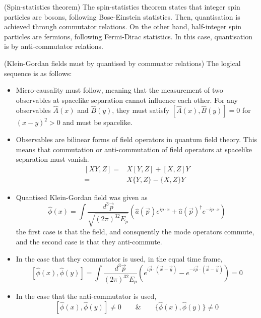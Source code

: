\vspace{2ex}
\begin{thm}
(Spin-statistics theorem) The spin-statistics theorem states that integer spin particles are bosons, following Bose-Einstein statistics. Then, quantisation is achieved through commutator relations. On the other hand, half-integer spin particles are fermions, following Fermi-Dirac statistics. In this case, quantisation is by anti-commutator relations.
\end{thm}
\vspace{2ex}
\begin{ex}
(Klein-Gordan fields must by quantised by commuator relations) The logical sequence is as follows:
\begin{itemize}
\item[(i)] Micro-causality must follow, meaning that the measurement of two observables at spacelike separation cannot influence each other. For any observables $\hat{A}(x)$ and $\hat{B}(y)$, they must satisfy $[\hat{A}(x),\hat{B}(y)]=0$ for $(x-y)^2>0$ and must be spacelike.
\item[(ii)] Observables are bilinear forms of field operators in quantum field theory. This means that commutation or anti-commutation of field operators at spacelike separation must vanish.
\[\begin{align*}
[XY,Z]=&X[Y,Z]+[X,Z]Y\\
=&X\{Y,Z\}-\{X,Z\}Y
\end{align*}\]
\item[(iii)] Quantised Klein-Gordan field was given as
\[\hat{\phi }(x)=\int \dfrac{d^3\vec{p}}{\sqrt{(2\pi )^32E_{p}}}(\hat{a}(\vec{p})e^{ip\cdot x}+\hat{a}(\vec{p})^{\dagger}e^{-ip\cdot x})\]
the first case is that the field, and consquently the mode operators commute, and the second case is that they anti-commute.
\item[(iv)] In the case that they commutator is used, in the equal time frame,
\[[\hat{\phi }(x),\hat{\phi }(y)]=\int \dfrac{d^3\vec{p}}{(2\pi )^32E_{p}}(e^{i\vec{p}\cdot (\vec{x}-\vec{y})}-e^{-i\vec{p}\cdot (\vec{x}-\vec{y})})=0\]
\item[(v)] In the case that the anti-commutator is used, \[[\hat{\phi}(x),\hat{\phi }(y)]\ne 0\qquad\&\qquad \{\hat{\phi }(x),\hat{\phi }(y)\}\ne 0\]

\end{itemize}
\end{ex}
\vspace{2ex}

